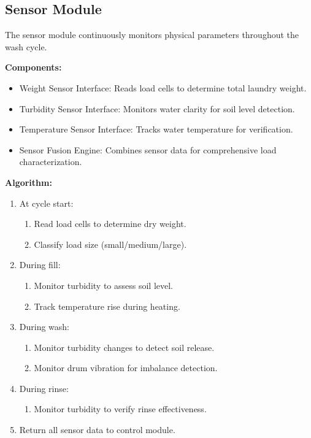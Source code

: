 \subsection{Sensor Module}

The sensor module continuously monitors physical parameters throughout the wash cycle.

\textbf{Components:}
\begin{itemize}
    \item Weight Sensor Interface: Reads load cells to determine total laundry weight.
    \item Turbidity Sensor Interface: Monitors water clarity for soil level detection.
    \item Temperature Sensor Interface: Tracks water temperature for verification.
    \item Sensor Fusion Engine: Combines sensor data for comprehensive load characterization.
\end{itemize}

\textbf{Algorithm:}
\begin{enumerate}
    \item At cycle start:
        \begin{enumerate}
            \item Read load cells to determine dry weight.
            \item Classify load size (small/medium/large).
        \end{enumerate}
    \item During fill:
        \begin{enumerate}
            \item Monitor turbidity to assess soil level.
            \item Track temperature rise during heating.
        \end{enumerate}
    \item During wash:
        \begin{enumerate}
            \item Monitor turbidity changes to detect soil release.
            \item Monitor drum vibration for imbalance detection.
        \end{enumerate}
    \item During rinse:
        \begin{enumerate}
            \item Monitor turbidity to verify rinse effectiveness.
        \end{enumerate}
    \item Return all sensor data to control module.
\end{enumerate}

